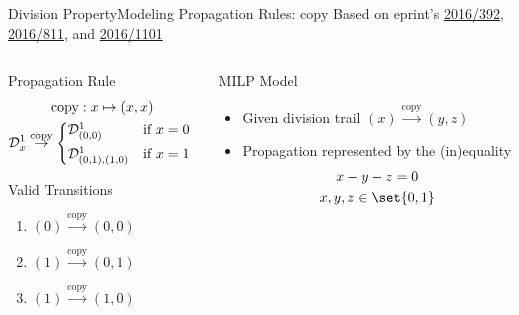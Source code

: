 \begin{frame}{Division Property}{Modeling Propagation Rules: $\mathrm{copy}$}
    \centering
    Based on eprint's \href{https://ia.cr/2016/392}{2016/392}, \href{https://ia.cr/2016/811}{2016/811}, and \href{https://ia.cr/2016/1101}{2016/1101}
    \begin{columns}
        \begin{column}{0.35\textwidth}
            \begin{block}{Propagation Rule}
                \vspace*{-15pt}
                \begin{gather*}
                    \mathrm{copy} : x \mapsto (x, x) \\
                    \mathcal{D}^1_x \stackrel{\mathrm{copy}}{\to} \begin{cases*}
                        \mathcal{D}^1_{(0,0)}       & if $x = 0$ \\
                        \mathcal{D}^1_{(0,1),(1,0)} & if $x = 1$
                    \end{cases*}
                \end{gather*}
                \vspace*{-3pt}
            \end{block}
            \begin{block}{Valid Transitions}
                \begin{enumerate}
                    \item \quad $(0) \stackrel{\mathrm{copy}}{\to} (0, 0)$
                    \item \quad $(1) \stackrel{\mathrm{copy}}{\to} (0, 1)$
                    \item \quad $(1) \stackrel{\mathrm{copy}}{\to} (1, 0)$
                \end{enumerate}
            \end{block}
            \pause
        \end{column}
        \begin{column}{0.575\textwidth}
            \begin{block}{MILP Model}
                \begin{itemize}
                    \item Given division trail $(x) \stackrel{\mathrm{copy}}{\to} (y, z)$\\[2pt]
                    \item Propagation represented by the (in)equality
                        \begin{gather*}
                            x - y - z = 0\\
                            x, y, z \in \set{0,1}
                        \end{gather*}
                \end{itemize}
            \end{block}
        \end{column}
    \end{columns}
\end{frame}


